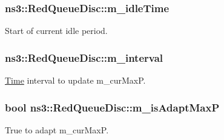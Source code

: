 \subsubsection[{\texorpdfstring{m\+\_\+idle\+Time}{m_idleTime}}]{ ns3\+::\+Red\+Queue\+Disc\+::m\+\_\+idle\+Time\hspace{0.3cm}{\ttfamily [private]}}\hypertarget{classns3_1_1RedQueueDisc_a004c1bec6f513969e91ddd353bd336e2}{}\label{classns3_1_1RedQueueDisc_a004c1bec6f513969e91ddd353bd336e2}


Start of current idle period. 

\subsubsection[{\texorpdfstring{m\+\_\+interval}{m_interval}}]{ ns3\+::\+Red\+Queue\+Disc\+::m\+\_\+interval\hspace{0.3cm}{\ttfamily [private]}}\hypertarget{classns3_1_1RedQueueDisc_a2b9b3cdf14386d08677f62199489d688}{}\label{classns3_1_1RedQueueDisc_a2b9b3cdf14386d08677f62199489d688}


\hyperlink{classns3_1_1Time}{Time} interval to update m\+\_\+cur\+MaxP. 

\subsubsection[{\texorpdfstring{m\+\_\+is\+Adapt\+MaxP}{m_isAdaptMaxP}}]{\setlength{\rightskip}{0pt plus 5cm}bool ns3\+::\+Red\+Queue\+Disc\+::m\+\_\+is\+Adapt\+MaxP\hspace{0.3cm}{\ttfamily [private]}}\hypertarget{classns3_1_1RedQueueDisc_a1bb942ecdce8c8c2eb9953f67ae9a0da}{}\label{classns3_1_1RedQueueDisc_a1bb942ecdce8c8c2eb9953f67ae9a0da}


True to adapt m\+\_\+cur\+MaxP. 

